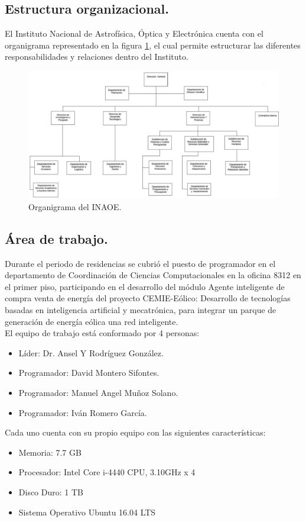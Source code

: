 \subsection{Estructura organizacional.}
El Instituto Nacional de Astrofísica, Óptica y Electrónica cuenta con el organigrama representado en la figura \ref{organigrama}, el cual permite estructurar las diferentes responsabilidades y relaciones dentro del Instituto. 

\begin{figure}[!h]
    \centering
    \includegraphics[width=17cm]{img/organigrama.png}
    \caption{Organigrama del INAOE.}
    \label{organigrama}
\end{figure}

\subsection{Área de trabajo.}

Durante el periodo de residencias se cubrió el puesto de programador en el departamento de Coordinación de Ciencias Computacionales en la oficina 8312 en el primer piso, participando en el desarrollo del módulo Agente inteligente de compra venta de energía del proyecto CEMIE-Eólico: Desarrollo de tecnologías basadas en inteligencia artificial y mecatrónica, para integrar un parque de generación de energía eólica una red inteligente.
\\

El equipo de trabajo está conformado por 4 personas:
\begin{itemize}
    \item Líder: Dr. Ansel Y Rodríguez González. 
    \item Programador: David Montero Sifontes.
    \item Programador: Manuel Angel Muñoz Solano.
    \item Programador: Iván Romero García.
\end{itemize}
 
Cada uno cuenta con su propio equipo con las siguientes características:

\begin{itemize}
    \item Memoria: 7.7 GB
    \item Procesador: Intel Core i-4440 CPU, 3.10GHz x 4
    \item Disco Duro: 1 TB
    \item Sistema Operativo Ubuntu 16.04 LTS
\end{itemize} 